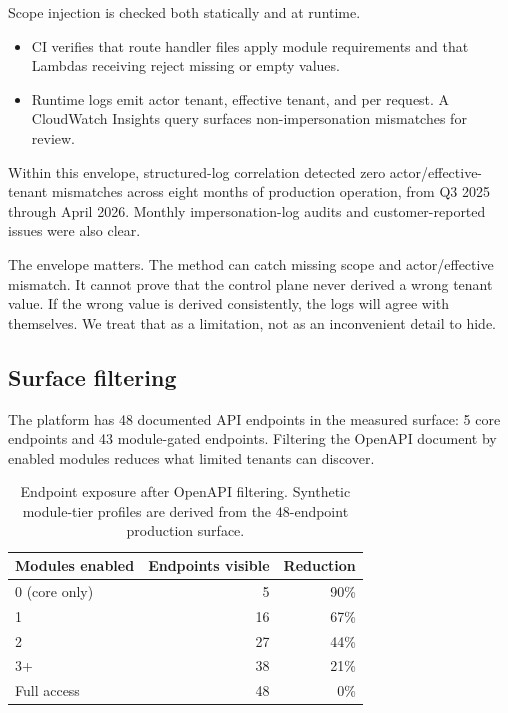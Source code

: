 Scope injection is checked both statically and at runtime.

\begin{itemize}
  \item CI verifies that route handler files apply module requirements and that Lambdas receiving \scopeprefix{} reject missing or empty values.
  \item Runtime logs emit actor tenant, effective tenant, and \scopeprefix{} per request. A CloudWatch Insights query surfaces non-impersonation mismatches for review.
\end{itemize}

Within this envelope, structured-log correlation detected zero actor/effective-tenant mismatches across eight months of production operation, from Q3 2025 through April 2026. Monthly impersonation-log audits and customer-reported issues were also clear.

The envelope matters. The method can catch missing scope and actor/effective mismatch. It cannot prove that the control plane never derived a wrong tenant value. If the wrong value is derived consistently, the logs will agree with themselves. We treat that as a limitation, not as an inconvenient detail to hide.

\subsection{Surface filtering}

The platform has 48 documented API endpoints in the measured surface: 5 core endpoints and 43 module-gated endpoints. Filtering the OpenAPI document by enabled modules reduces what limited tenants can discover.

\begin{table}[H]
  \centering
  \small
  \begin{tabularx}{0.72\textwidth}{X r r}
    \toprule
    \textbf{Modules enabled} & \textbf{Endpoints visible} & \textbf{Reduction} \\
    \midrule
    0 (core only) & 5  & 90\% \\
    1             & 16 & 67\% \\
    2             & 27 & 44\% \\
    3+            & 38 & 21\% \\
    Full access   & 48 & 0\% \\
    \bottomrule
  \end{tabularx}
  \caption{Endpoint exposure after OpenAPI filtering. Synthetic module-tier profiles are derived from the 48-endpoint production surface.}
  \label{tab:surface}
\end{table}

